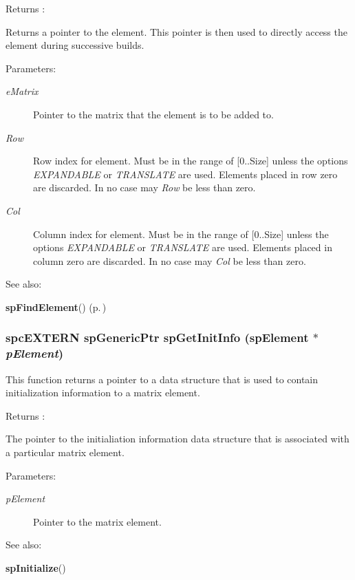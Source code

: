 \begin{Desc}
\item[Returns :]\par
 Returns a pointer to the element. This pointer is then used to directly access the element during successive builds.\end{Desc}
\begin{Desc}
\item[Parameters: ]\par
\begin{description}
\item[{\em 
e\-Matrix}]Pointer to the matrix that the element is to be added to. \item[{\em 
Row}]Row index for element. Must be in the range of [0..Size] unless the options {\em EXPANDABLE} or {\em TRANSLATE} are used. Elements placed in row zero are discarded. In no case may {\em Row} be less than zero. \item[{\em 
Col}]Column index for element. Must be in the range of [0..Size] unless the options {\em EXPANDABLE} or {\em TRANSLATE} are used. Elements placed in column zero are discarded. In no case may {\em Col} be less than zero.\end{description}
\end{Desc}
\begin{Desc}
\item[See also: ]\par
{\bf sp\-Find\-Element}() {\rm (p.\,\pageref{spMatrix_8h_a34})} \end{Desc}
\subsubsection{\setlength{\rightskip}{0pt plus 5cm}spc\-EXTERN sp\-Generic\-Ptr sp\-Get\-Init\-Info ({\bf sp\-Element} $\ast$ {\em p\-Element})}\label{spMatrix_8h_a37}


This function returns a pointer to a data structure that is used to contain initialization information to a matrix element.

\begin{Desc}
\item[Returns :]\par
 The pointer to the initialiation information data structure that is associated with a particular matrix element.\end{Desc}
\begin{Desc}
\item[Parameters: ]\par
\begin{description}
\item[{\em 
p\-Element}]Pointer to the matrix element.\end{description}
\end{Desc}
\begin{Desc}
\item[See also: ]\par
{\bf sp\-Initialize}() \end{Desc}
